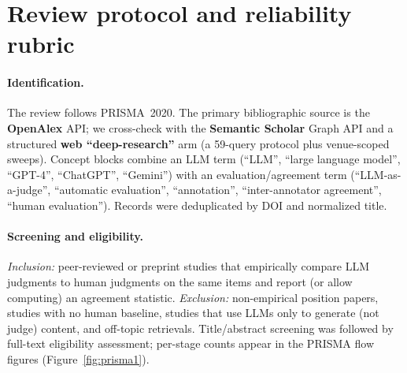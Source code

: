 \appendix

\section{Review protocol and reliability rubric}\label{app:protocol}
\paragraph{Identification.} The review follows PRISMA~2020. The primary bibliographic source is the \textbf{OpenAlex} API; we cross-check with the \textbf{Semantic Scholar} Graph API and a structured \textbf{web ``deep-research''} arm (a 59-query protocol plus venue-scoped sweeps). Concept blocks combine an LLM term (``LLM'', ``large language model'', ``GPT-4'', ``ChatGPT'', ``Gemini'') with an evaluation/agreement term (``LLM-as-a-judge'', ``automatic evaluation'', ``annotation'', ``inter-annotator agreement'', ``human evaluation''). Records were deduplicated by DOI and normalized title.

\paragraph{Screening and eligibility.} \emph{Inclusion:} peer-reviewed or preprint studies that empirically compare
LLM judgments to human judgments on the same items and report (or allow computing) an agreement statistic.
\emph{Exclusion:} non-empirical position papers, studies with no human baseline, studies that use LLMs only to
generate (not judge) content, and off-topic retrievals. Title/abstract screening was followed by full-text
eligibility assessment; per-stage counts appear in the PRISMA flow figures (Figure~\ref{fig:prisma1}).

